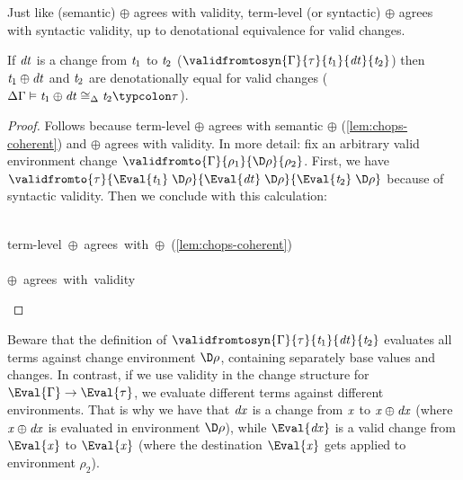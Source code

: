 Just like (semantic) \ensuremath{\oplus } agrees with validity, term-level
(or syntactic) \ensuremath{\oplus } agrees with syntactic validity, up to
denotational equivalence for valid changes.
\begin{lemma}
If \ensuremath{\Varid{dt}} is a change from \ensuremath{\Varid{t}_{1}} to \ensuremath{\Varid{t}_{2}} (\ensuremath{\validfromtosyn{\Gamma}{\tau}{\Varid{t}_{1}}{\Varid{dt}}{\Varid{t}_{2}}}) then \ensuremath{\Varid{t}_{1}\oplus \Varid{dt}} and \ensuremath{\Varid{t}_{2}} are denotationally equal for
valid changes (\ensuremath{\Delta \Gamma\vDash\Varid{t}_{1}\oplus \Varid{dt}\mathrel{\cong_\Delta}\Varid{t}_{2}\typcolon\tau}).
\end{lemma}
\begin{proof}
  Follows because term-level \ensuremath{\oplus } agrees with semantic \ensuremath{\oplus }
  (\cref{lem:chops-coherent}) and \ensuremath{\oplus } agrees with validity.
  In more detail: fix an arbitrary valid environment change
  \ensuremath{\validfromto{\Gamma}{\rho_{1}}{\D\rho}{\rho_{2}}}.
  First, we have \ensuremath{\validfromto{\tau}{\Eval{\Varid{t}_{1}}\;\D\rho}{\Eval{\Varid{dt}}\;\D\rho}{\Eval{\Varid{t}_{2}}\;\D\rho}} because of syntactic validity.
  Then we conclude with this calculation:
\begin{equational}
\begin{hscode}\SaveRestoreHook
{}%
%
%
%
\>[4]{}\;\D\rho{}\<[E]%
\\
\>[B]{}\mathrel{=}{}\<[BE]%
\>[4]{}\mbox{\commentbegin  term-level \ensuremath{\oplus } agrees with \ensuremath{\oplus } (\cref{lem:chops-coherent})  \commentend}{}\<[E]%
\\
\>[4]{}\;\D\rho\oplus {}\;\D\rho{}\<[E]%
\\
\>[B]{}\mathrel{=}{}\<[BE]%
\>[4]{}\mbox{\commentbegin  \ensuremath{\oplus } agrees with validity  \commentend}{}\<[E]%
\\
\>[4]{}\;\D\rho{}\<[E]%
\ColumnHook
\end{hscode}\resethooks
\end{equational}
\end{proof}

Beware that the definition of \ensuremath{\validfromtosyn{\Gamma}{\tau}{\Varid{t}_{1}}{\Varid{dt}}{\Varid{t}_{2}}}
evaluates all terms against change environment \ensuremath{\D\rho}, containing
separately base values and changes. In contrast, if we use
validity in the change structure for \ensuremath{\Eval{\Gamma}\to \Eval{\tau}}, we
evaluate different terms against different environments. That is
why we have that \ensuremath{\Varid{dx}} is a change from \ensuremath{\Varid{x}} to \ensuremath{\Varid{x}\oplus \Varid{dx}}
(where \ensuremath{\Varid{x}\oplus \Varid{dx}} is evaluated in environment \ensuremath{\D\rho}),
while \ensuremath{\Eval{\Varid{dx}}} is a valid change from \ensuremath{\Eval{\Varid{x}}} to \ensuremath{\Eval{\Varid{x}}}
(where the destination \ensuremath{\Eval{\Varid{x}}} gets applied to environment \ensuremath{\rho_{2}}).

